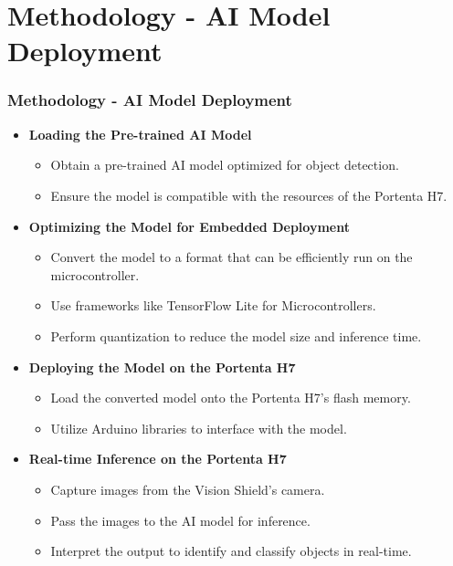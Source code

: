 \documentclass[10pt, a4paper]{beamer}
\begin{document}
	
	\section{Methodology - AI Model Deployment}
	\begin{frame}
		\frametitle{Methodology - AI Model Deployment}
		
		\begin{itemize}
			\item \textbf{Loading the Pre-trained AI Model}
			\begin{itemize}
				\item Obtain a pre-trained AI model optimized for object detection.
				\item Ensure the model is compatible with the resources of the Portenta H7.
			\end{itemize}
			\vspace{0.3cm}
			
			\item \textbf{Optimizing the Model for Embedded Deployment}
			\begin{itemize}
				\item Convert the model to a format that can be efficiently run on the microcontroller.
				\item Use frameworks like TensorFlow Lite for Microcontrollers.
				\item Perform quantization to reduce the model size and inference time.
			\end{itemize}
			\vspace{0.3cm}
			
			\item \textbf{Deploying the Model on the Portenta H7}
			\begin{itemize}
				\item Load the converted model onto the Portenta H7's flash memory.
				\item Utilize Arduino libraries to interface with the model.
			\end{itemize}
			\vspace{0.3cm}
			
			\item \textbf{Real-time Inference on the Portenta H7}
			\begin{itemize}
				\item Capture images from the Vision Shield's camera.
				\item Pass the images to the AI model for inference.
				\item Interpret the output to identify and classify objects in real-time.
			\end{itemize}
		\end{itemize}
	\end{frame}
	
\end{document}
